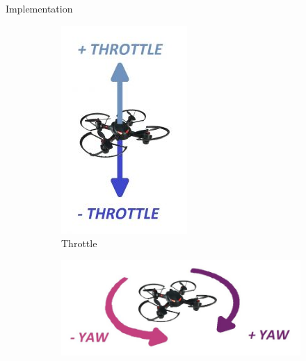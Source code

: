 \documentclass[12pt, oneside]{report}
\numberwithin{equation}{section}
\begin{document}
\begin{chapter}{Implementation}
\begin{figure}[h]
\center
\begin{subfigure}[hb]{0.2\textwidth}
\includegraphics[width=\textwidth]{Throttle}
\caption{Throttle}
\end{subfigure}
\begin{subfigure}[hb]{0.2\textwidth}
\includegraphics[width=\textwidth]{Yaw}

\end{subfigure}
\end{figure}
\end{chapter}
\end{document}
